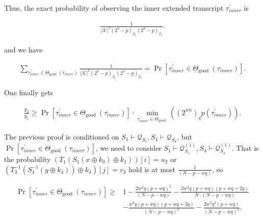 Thus, the exact probability of observing the inner extended transcript $\tau_{inner}^{\prime}$ is

$$
\begin{aligned}
\frac{1}{|\mathcal{K}|^{3}\left(2^{n}-p\right)_{\beta_{2}}\left(2^{n}-p\right)_{\beta_{3}}}.
\end{aligned}
$$

and we have

$$
\begin{aligned}
\sum_{\tau_{inner}^{\prime} \in \Theta_{\text {good }}(\tau_{inner})} \frac{1}{|\mathcal{K}|^{3}\left(2^{n}-p\right)_{\beta_{2}}\left(2^{n}-p\right)_{\beta_{3}}} = \operatorname{Pr}\left[ \tau_{inner}^{\prime} \in \Theta_{\text {good }}(\tau_{inner})\right].
\end{aligned}
$$

One finally gets

\begin{equation}
\begin{aligned}
\frac{\mathrm{p}_{2}}{\mathrm{p}_{1}} \geq \operatorname{Pr}\left[ \tau_{inner}^{\prime} \in \Theta_{\text {good }}(\tau_{inner})\right] \cdot \min _{\tau_{inner}^{\prime} \in \Theta_{\text {good }}}((2^{w n})_{q} p(\tau_{inner}^{\prime})).
\end{aligned}
\end{equation}

The previous proof is conditioned on $S_{1} \vdash \mathcal{Q}_{S_{1}}, S_{4} \vdash \mathcal{Q}_{S_{4}}$, but $\operatorname{Pr}\left[ \tau_{inner}^{\prime} \in \Theta_{\text {good }}(\tau_{inner})\right]$, we need to consider $S_{1} \vdash \mathcal{Q}_{S_{1}}^{(1)}, S_{4} \vdash \mathcal{Q}_{S_{4}}^{(1)}$. That is the probability $\left(T_{1}\left(S_{1}\left(x \oplus k_{0}\right) \oplus k_{1}\right)\right)[i]=u_2$ or $\left(T_{3}^{-1}\left(S_{4}^{-1}\left(y \oplus k_{4}\right)\right) \oplus k_{3}\right)[j]=v_3$ hold is at most $\frac{1}{(N-p-w q)}$, so

\begin{equation}
\begin{aligned}
\operatorname{Pr}\left[ \tau_{inner}^{\prime} \in \Theta_{\text {good }}(\tau_{inner})\right] \geq &1- \frac{2 w^{2} q (p+w q)^{2}}{(N-p-w q)} -\frac{2 w^{2} q (p+w q)(p+w q+2 q)}{N \cdot (N-p-w q)}\\
&- \frac{w^{2} q (p+w q)(p+w q+2 q)}{(N-p-w q)^2} - \frac{2 w^{2} q^{2} (p+w q)}{(N- p- wq)^2}.
\end{aligned}
\end{equation}


